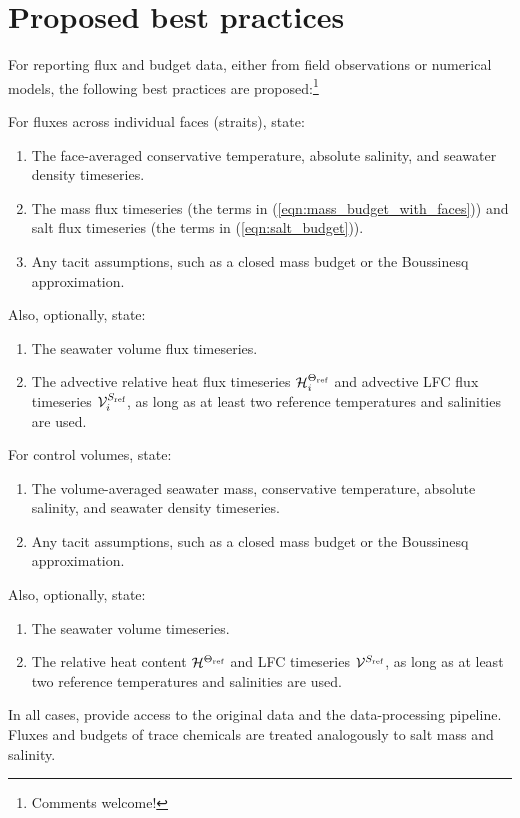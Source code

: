 \documentclass[10pt]{amsart}
\newcommand{\Thref}{\Theta_{\mbox{\tiny ref}}}
\newcommand{\Sref}{S_{\mbox{\tiny ref}}}
\newcommand{\V}{{\mathcal V}}
\newcommand{\Heat}{{\mathcal H}^{\Thref}}
\newcommand{\LFC}{\V^{\Sref}}
\begin{document}
\section{Proposed best practices}

For reporting flux and budget data, either from field observations or numerical models, the following best practices are proposed:\footnote{Comments welcome!}

For fluxes across individual faces (straits), state:
\begin{enumerate}
\item The face-averaged conservative temperature, absolute salinity, and seawater density timeseries.
\item The mass flux timeseries (the terms in (\ref{eqn:mass_budget_with_faces})) and salt flux timeseries (the terms in (\ref{eqn:salt_budget})).
\item Any tacit assumptions, such as a closed mass budget or the Boussinesq approximation.
\end{enumerate}
Also, optionally, state:
\begin{enumerate}
\item The seawater volume flux timeseries.
\item The advective relative heat flux timeseries $\Heat_i$ and advective LFC flux timeseries $\LFC_i$, as long as at least two reference temperatures and salinities are used. 
\end{enumerate}
For control volumes, state:
\begin{enumerate}
\item The volume-averaged seawater mass, conservative temperature, absolute salinity, and seawater density timeseries. 
\item Any tacit assumptions, such as a closed mass budget or the Boussinesq approximation.
\end{enumerate}
Also, optionally, state:
\begin{enumerate}
\item The seawater volume timeseries.
\item The relative heat content $\Heat$ and LFC timeseries $\LFC$, as long as at least two reference temperatures and salinities are used. 
\end{enumerate}

In all cases, provide access to the original data and the data-processing pipeline.
Fluxes and budgets of trace chemicals are treated analogously to salt mass and salinity.





\end{document}
